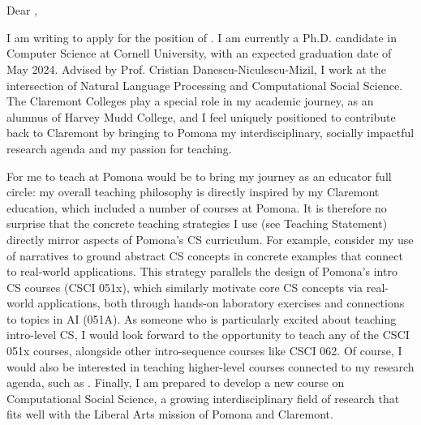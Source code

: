 \documentclass[12pt]{letter}
\begin{document}
\signature{Jonathan P. Chang}
\begin{letter}{
\department \\
\schoolnamelong \\
\schooladdress
}

\opening{
    Dear ,
}

I am writing to apply for the position of \position.
I am currently a Ph.D. candidate in Computer Science at Cornell University, with an expected graduation date of May 2024.
Advised by Prof. Cristian Danescu-Niculescu-Mizil, I work at the intersection of Natural Language Processing and Computational Social Science.
The Claremont Colleges play a special role in my academic journey, as an alumnus of Harvey Mudd College, and I feel uniquely positioned to contribute back to Claremont by bringing to Pomona my interdisciplinary, socially impactful research agenda and my passion for teaching.

For me to teach at Pomona would be to bring my journey as an educator full circle: my overall teaching philosophy is directly inspired by my Claremont education, which included a number of courses at Pomona.
It is therefore no surprise that the concrete teaching strategies I use (see Teaching Statement) directly mirror aspects of Pomona's CS curriculum.
For example, consider my use of narratives to ground abstract CS concepts in concrete examples that connect to real-world applications.
This strategy parallels the design of Pomona's intro CS courses (CSCI 051x), which similarly motivate core CS concepts via real-world applications, both through hands-on laboratory exercises and connections to topics in AI (051A).
As someone who is particularly excited about teaching intro-level CS, I would look forward to the opportunity to teach any of the CSCI 051x courses, alongside other intro-sequence courses like CSCI 062.
Of course, I would also be interested in teaching higher-level courses connected to my research agenda, such as \schooladvcourses.
Finally, I am prepared to develop a new course on Computational Social Science, a growing interdisciplinary field of research that fits well with the Liberal Arts mission of Pomona and Claremont.


\end{letter}
\end{document}
